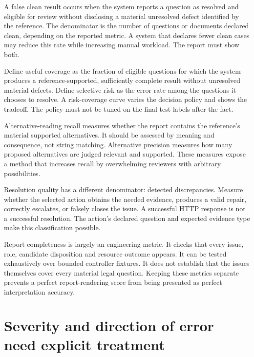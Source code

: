 A false clean result occurs when the system reports a question as resolved and
eligible for review without disclosing a material unresolved defect identified by
the reference. The denominator is the number of questions or documents declared
clean, depending on the reported metric. A system that declares fewer clean cases
may reduce this rate while increasing manual workload. The report must show both.

Define useful coverage as the fraction of eligible questions for which the system
produces a reference-supported, sufficiently complete result without unresolved
material defects. Define selective risk as the error rate among the questions it
chooses to resolve. A risk-coverage curve varies the decision policy and shows the
tradeoff. The policy must not be tuned on the final test labels after the fact.


Alternative-reading recall measures whether the report contains the reference's
material supported alternatives. It should be assessed by meaning and consequence,
not string matching. Alternative precision measures how many proposed alternatives
are judged relevant and supported. These measures expose a method that increases
recall by overwhelming reviewers with arbitrary possibilities.

Resolution quality has a different denominator: detected discrepancies. Measure
whether the selected action obtains the needed evidence, produces a valid repair,
correctly escalates, or falsely closes the issue. A successful HTTP response is
not a successful resolution. The action's declared question and expected evidence
type make this classification possible.

Report completeness is largely an engineering metric. It checks that every issue,
role, candidate disposition and resource outcome appears. It can be tested
exhaustively over bounded controller fixtures. It does not establish that the
issues themselves cover every material legal question. Keeping these metrics
separate prevents a perfect report-rendering score from being presented as
perfect interpretation accuracy.

\section{Severity and direction of error need explicit treatment}
\label{merge:M09:06}


